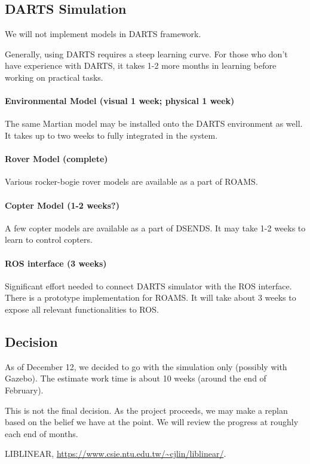 \documentclass[conference]{IEEEtran}
\newcommand{\kyon}[1]{{\color{cyan} #1}}
\newcommand{\done}[1]{{\color{gray} #1}}
\begin{document}
\done{
\subsection{DARTS Simulation}

\kyon{We will not implement models in DARTS framework.}

Generally, using DARTS requires a steep learning curve. For those who don't have experience with DARTS, it takes 1-2 more months in learning before working on practical tasks. 

\paragraph{Environmental Model (visual 1 week; physical 1 week)}
The same Martian model may be installed onto the DARTS environment as well. It takes up to two weeks to fully integrated in the system.

\paragraph{Rover Model (complete)}
Various rocker-bogie rover models are available as a part of ROAMS.

\paragraph{Copter Model (1-2 weeks?)}
A few copter models are available as a part of DSENDS. It may take 1-2 weeks to learn to control copters.

\paragraph{ROS interface (3 weeks)}
Significant effort needed to connect DARTS simulator with the ROS interface. There is a prototype implementation for ROAMS. It will take about 3 weeks to expose all relevant functionalities to ROS.
}

\subsection{Decision}
As of December 12, we decided to go with the simulation only (possibly with Gazebo). The estimate work time is about 10 weeks (around the end of February). 

This is not the final decision. As the project proceeds, we may make a replan based on the belief we have at the point. We will review the progress at roughly each end of months. 


\begin{thebibliography}{99}
LIBLINEAR, \url{https://www.csie.ntu.edu.tw/~cjlin/liblinear/}.

\end{thebibliography}
\end{document}
